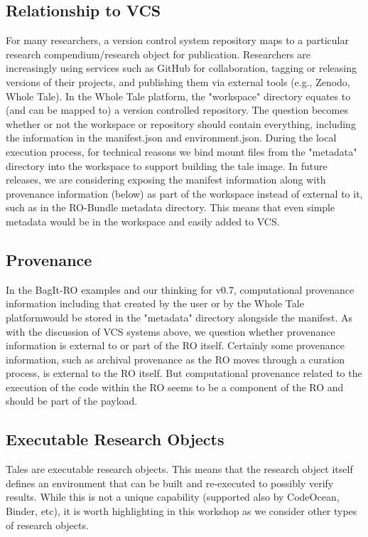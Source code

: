 \documentclass[conference]{IEEEtran}
\begin{document}
\subsection{Relationship to VCS}
For many researchers, a version control system repository maps to a particular research 
compendium/research object for publication. Researchers are increasingly using services such as 
GitHub for collaboration, tagging or releasing versions of their projects, and publishing them via 
external tools (e.g., Zenodo, Whole Tale).  In the Whole Tale platform, the "workspace" directory 
equates to (and can be mapped to) a version controlled  repository.  The question becomes whether 
or not the workspace or repository should contain everything, including the information in the 
manifest.json and environment.json.  During the local execution process, for technical reasons we 
bind mount files from the "metadata" directory into the workspace to support building the tale 
image.  In future releases, we are considering exposing the manifest information along with 
provenance information (below) as part of the workspace instead of external to it, such as in the 
RO-Bundle metadata directory.  This means that even simple metadata would be in the workspace and 
easily added to VCS.

\subsection{Provenance}
In the BagIt-RO examples and our thinking for v0.7, computational provenance information including 
that created by the user or by the Whole Tale platformwould be stored in the "metadata" directory 
alongside the manifest.  As with the discussion of VCS systems above, we question whether 
provenance information is external to or part of the RO itself.  Certainly some provenance 
information, such as archival provenance as the RO moves through a curation process, is external 
to the RO itself. But computational provenance related to the execution of the code within the RO 
seems to be a component of the RO and should be part of the payload.

\subsection{Executable Research Objects}
Tales are executable research objects. This means that the research object itself defines an 
environment that can be built and re-executed to possibly verify results. While this is not a 
unique capability (supported also by CodeOcean, Binder, etc), it is worth highlighting in this 
workshop as we consider other types of research objects.
\end{document}
